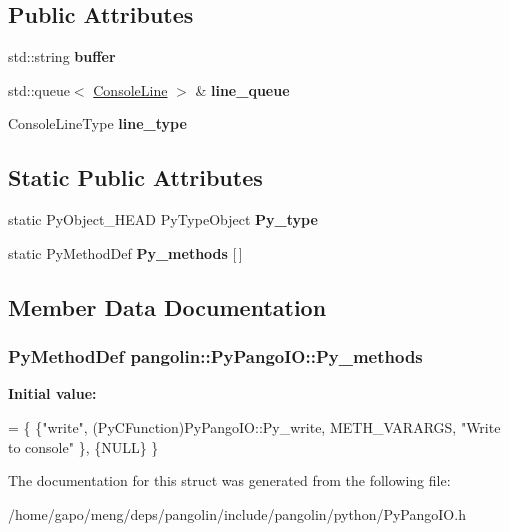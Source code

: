 \subsection*{Public Attributes}
\begin{DoxyCompactItemize}
\item 
std\+::string {\bfseries buffer}\hypertarget{structpangolin_1_1_py_pango_i_o_aa9b5f727d226c9c9ef6867e92c610bb4}{}\label{structpangolin_1_1_py_pango_i_o_aa9b5f727d226c9c9ef6867e92c610bb4}

\item 
std\+::queue$<$ \hyperlink{classpangolin_1_1_console_line}{Console\+Line} $>$ \& {\bfseries line\+\_\+queue}\hypertarget{structpangolin_1_1_py_pango_i_o_a20c29d09809db19ce2d83ef461fdef93}{}\label{structpangolin_1_1_py_pango_i_o_a20c29d09809db19ce2d83ef461fdef93}

\item 
Console\+Line\+Type {\bfseries line\+\_\+type}\hypertarget{structpangolin_1_1_py_pango_i_o_a05d6e69ccbc944325b59f087980e4824}{}\label{structpangolin_1_1_py_pango_i_o_a05d6e69ccbc944325b59f087980e4824}

\end{DoxyCompactItemize}
\subsection*{Static Public Attributes}
\begin{DoxyCompactItemize}
\item 
static Py\+Object\+\_\+\+H\+E\+AD Py\+Type\+Object {\bfseries Py\+\_\+type}\hypertarget{structpangolin_1_1_py_pango_i_o_a7aae650a6e75ee086dc50cfd4bb76257}{}\label{structpangolin_1_1_py_pango_i_o_a7aae650a6e75ee086dc50cfd4bb76257}

\item 
static Py\+Method\+Def {\bfseries Py\+\_\+methods} \mbox{[}$\,$\mbox{]}
\end{DoxyCompactItemize}


\subsection{Member Data Documentation}
\subsubsection[{\texorpdfstring{Py\+\_\+methods}{Py_methods}}]{\setlength{\rightskip}{0pt plus 5cm}Py\+Method\+Def pangolin\+::\+Py\+Pango\+I\+O\+::\+Py\+\_\+methods\hspace{0.3cm}{\ttfamily [static]}}\hypertarget{structpangolin_1_1_py_pango_i_o_a16ce452a74d6cda7903a0b3f6a7e6bb0}{}\label{structpangolin_1_1_py_pango_i_o_a16ce452a74d6cda7903a0b3f6a7e6bb0}
{\bfseries Initial value\+:}
\begin{DoxyCode}
= \{
    \{\textcolor{stringliteral}{"write"}, (PyCFunction)PyPangoIO::Py\_write, METH\_VARARGS, \textcolor{stringliteral}{"Write to console"} \},
    \{NULL\}
\}
\end{DoxyCode}


The documentation for this struct was generated from the following file\+:\begin{DoxyCompactItemize}
\item 
/home/gapo/meng/deps/pangolin/include/pangolin/python/Py\+Pango\+I\+O.\+h\end{DoxyCompactItemize}
